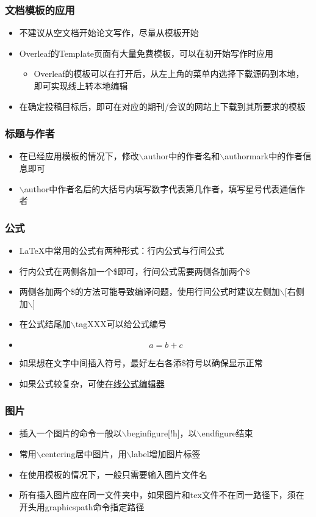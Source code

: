 \documentclass{beamer}
\begin{document}
\begin{frame} 
    \frametitle{文档模板的应用} 
    \begin{itemize} 
        \item 不建议从空文档开始论文写作，尽量从模板开始
        \item Overleaf的Template页面有大量免费模板，可以在初开始写作时应用
        \begin{itemize}
            \item Overleaf的模板可以在打开后，从左上角的菜单内选择下载源码到本地，即可实现线上转本地编辑
        \end{itemize}
        \item 在确定投稿目标后，即可在对应的期刊/会议的网站上下载到其所要求的模板
    \end{itemize} 
\end{frame}

\begin{frame} 
    \frametitle{标题与作者} 
    \begin{itemize} 
        \item 在已经应用模板的情况下，修改$\backslash$author中的作者名和$\backslash$authormark中的作者信息即可
        \item $\backslash$author中作者名后的大括号内填写数字代表第几作者，填写星号代表通信作者
    \end{itemize} 
\end{frame}

\begin{frame} 
    \frametitle{公式} 
    \begin{itemize} 
        \item \LaTeX{}中常用的公式有两种形式：行内公式与行间公式
        \item 行内公式在两侧各加一个\$即可，行间公式需要两侧各加两个\$
        \item 两侧各加两个\$的方法可能导致编译问题，使用行间公式时建议左侧加$\backslash$[右侧加$\backslash$]
        \item 在公式结尾加$\backslash$tag{XXX}可以给公式编号
        \item \[a=b+c \tag*{5.1}\]
        \item 如果想在文字中间插入符号，最好左右各添\$符号以确保显示正常
        \item 如果公式较复杂，可使\href{https://latex.codecogs.com/eqneditor/editor.php?lang=zh-cn}{在线公式编辑器}
    \end{itemize} 
\end{frame}

\begin{frame} 
    \frametitle{图片} 
    \begin{itemize} 
        \item 插入一个图片的命令一般以{$\backslash$begin{figure}[!h]}，以$\backslash$end{figure}结束
        \item 常用$\backslash$centering居中图片，用$\backslash$label增加图片标签
        \item 在使用模板的情况下，一般只需要输入图片文件名
        \item 所有插入图片应在同一文件夹中，如果图片和tex文件不在同一路径下，须在开头用graphicspath命令指定路径
    \end{itemize} 
\end{frame}
\end{document}

